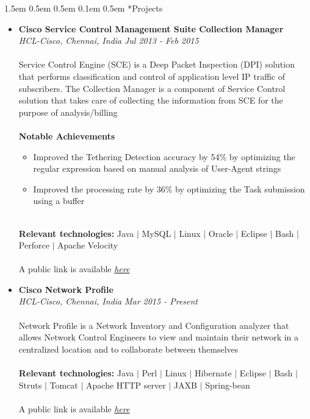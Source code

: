 \documentclass[a4paper, 12pt]{article}
\makeatletter
\renewcommand\section{\@startsection{section}{1}{\z@}%
                                  {1.5em \@plus 0.5em \@minus 0.5em}%
                                  {0.1em \@plus 0.5em}%
                                  {\small\bfseries\sc}}
\makeatother
\begin{document}
\section*{Projects}
\begin{adjustwidth}{1.3em}{0pt}
\begin{itemize}
  \item \textbf{Cisco Service Control Management Suite Collection Manager}\\
        \textsl{HCL-Cisco, Chennai, India} \hfill
        \emph{Jul 2013 - Feb 2015}\\
        \\
        Service Control Engine (SCE) is a Deep Packet Inspection (DPI) solution
        that performs classification and control of application level IP traffic
        of subscribers. The Collection Manager is a component of Service Control
        solution that takes care of collecting the information from SCE for the
        purpose of analysis/billing\\
        \\
        \textbf{\small{Notable Achievements}}
        \begin{itemize}
          \item Improved the Tethering Detection accuracy by 54\% by optimizing
                the regular expression based on manual analysis of User-Agent
                strings
          \item Improved the processing rate by 36\% by optimizing the Task
                submission using a buffer
        \end{itemize}
        \vspace{1em}
        \\
        \textbf{\small{Relevant technologies:}} Java $|$ MySQL $|$ Linux $|$
        Oracle $|$ Eclipse $|$ Bash $|$ Perforce $|$ Apache Velocity\\
        \\
        A public link is available \href{http://www.cisco.com/c/en/us/products/service-exchange/sce-8000-series-service}{\emph{here}}\\

  \item \textbf{Cisco Network Profile}\\
        \textsl{HCL-Cisco, Chennai, India} \hfill
        \emph{Mar 2015 - Present}\\
        \\
        Network Profile is a Network Inventory and Configuration analyzer that
        allows Network Control Engineers to view and maintain their network in a
        centralized location and to collaborate between themselves\\
        \\
        \textbf{\small{Relevant technologies:}} Java $|$ Perl $|$ Linux $|$
        Hibernate $|$ Eclipse $|$ Bash $|$ Struts $|$ Tomcat $|$ Apache HTTP
        server $|$ JAXB $|$ Spring-bean\\
        \\
        A public link is available \href{http://www.cisco.com/web/tsweb/tools/network-profile/index.html}{\emph{here}}
\end{itemize}
\end{adjustwidth}
\end{document}
